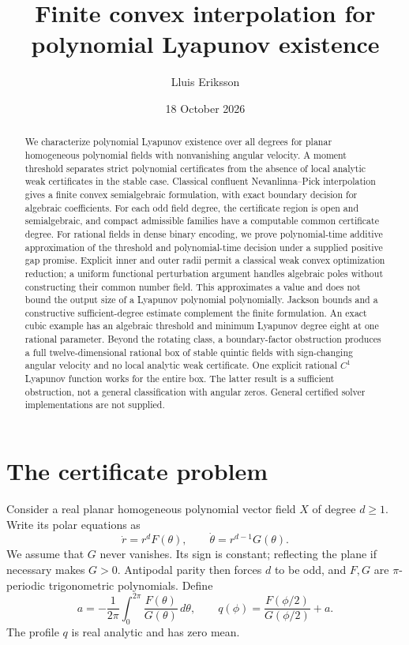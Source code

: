 \documentclass[11pt,a4paper]{article}
\title{Finite convex interpolation for polynomial Lyapunov existence}
\author{Lluis Eriksson}
\date{18 October 2026}
\theoremstyle{remark}\newtheorem{remark}[theorem]{Remark}
\begin{document}
\maketitle
\begin{abstract}
We characterize polynomial Lyapunov existence over all degrees for planar
homogeneous polynomial fields with nonvanishing angular velocity.
A moment threshold separates strict polynomial certificates from the
absence of local analytic weak certificates in the stable case.
Classical confluent Nevanlinna--Pick interpolation gives a finite convex
semialgebraic formulation, with exact boundary decision for algebraic
coefficients. For each odd field degree, the certificate region is open
and semialgebraic, and compact admissible families have a computable
common certificate degree.
For rational fields in dense binary encoding, we prove polynomial-time
additive approximation of the threshold and polynomial-time decision
under a supplied positive gap promise. Explicit inner and outer radii
permit a classical weak convex optimization reduction; a uniform
functional perturbation argument handles algebraic poles without
constructing their common number field. This approximates a value and
does not bound the output size of a Lyapunov polynomial polynomially.
Jackson bounds and a constructive sufficient-degree estimate complement
the finite formulation. An exact cubic example has an algebraic threshold
and minimum Lyapunov degree eight at one rational parameter.
Beyond the rotating class, a boundary-factor obstruction produces a
full twelve-dimensional rational box of stable quintic fields with
sign-changing angular velocity and no local analytic weak certificate.
One explicit rational $C^1$ Lyapunov function works for the entire box.
The latter result is a sufficient obstruction, not a general classification
with angular zeros. General certified solver implementations are not supplied.
\end{abstract}

\section{The certificate problem}
Consider a real planar homogeneous polynomial vector field \(X\) of
degree \(d\geq1\). Write its polar equations as
\begin{equation}\label{eq:polar}
 \dot r=r^d F(\theta),\qquad
 \dot\theta=r^{d-1}G(\theta).
\end{equation}
We assume that \(G\) never vanishes. Its sign is constant; reflecting
the plane if necessary makes \(G>0\). Antipodal parity then forces
\(d\) to be odd, and \(F,G\) are \(\pi\)-periodic trigonometric
polynomials. Define
\begin{equation}\label{eq:profile}
 a=-\frac1{2\pi}\int_0^{2\pi}\frac{F(\theta)}{G(\theta)}\,d\theta,
 \qquad
 q(\phi)=\frac{F(\phi/2)}{G(\phi/2)}+a.
\end{equation}
The profile \(q\) is real analytic and has zero mean.
\end{document}
